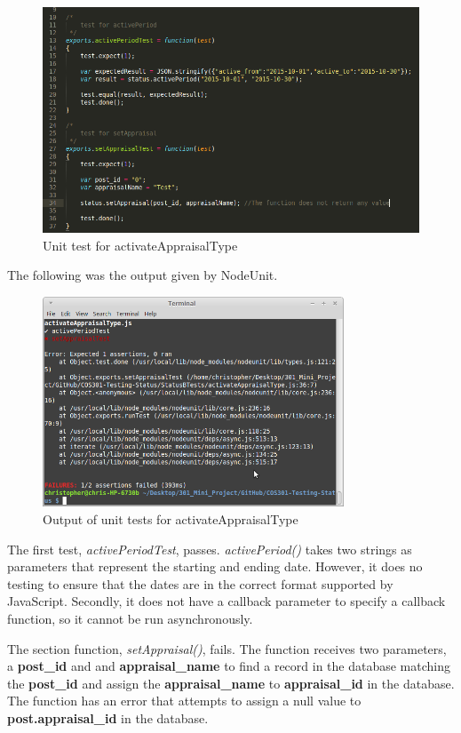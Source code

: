 \documentclass[a4paper,12pt]{article}
\begin{document}
	\begin{figure}[H]
		\centering
		\includegraphics[width=1.0\textwidth]{Figures/activateAppraisalTypeUnitTests.png}
		\caption{Unit test for activateAppraisalType}
	\end{figure}

The following was the output given by NodeUnit.

	\begin{figure}[H]
		\centering
		\includegraphics[width=0.8\textwidth]{Figures/activateAppraisalTypeUnitTestOutput.png}
		\caption{Output of unit tests for activateAppraisalType}
	\end{figure}

The first test, \textit{activePeriodTest}, passes. \textit{activePeriod()} takes two strings as parameters that represent the starting and ending date. However, it does no testing to ensure that the dates are in the correct format supported by JavaScript. Secondly, it does not have a callback parameter to specify a callback function, so it cannot be run asynchronously.

The section function, \textit{setAppraisal()}, fails. The function receives two parameters, a \textbf{post\_id} and and \textbf{appraisal\_name} to find a record in the database matching the \textbf{post\_id} and assign the \textbf{appraisal\_name} to \textbf{appraisal\_id} in the database. The function has an error that attempts to assign a null value to \textbf{post.appraisal\_id} in the database. 
\end{document}
